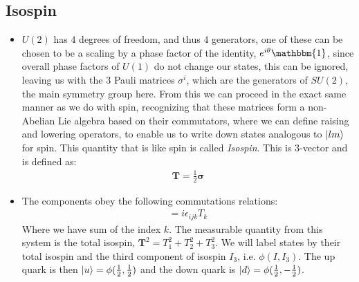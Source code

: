 \documentclass[11pt]{article}
\numberwithin{equation}{section}
\begin{document}
\subsection{Isospin} %
\label{sub:isospin}
\begin{itemize}
    \item  $U(2)$ has $4$ degrees of freedom, and thus $4$ generators, one of these can be chosen to be a scaling by a phase factor of the identity, $e^{i\theta}\mathbbm{1}$, since overall phase factors of $U(1)$ do not change our states, this can be ignored, leaving us with the $3$ Pauli matrices $\sigma^i$, which are the generators of $SU(2)$, the main symmetry group here. From this we can proceed in the exact same manner as we do with spin, recognizing that these matrices form a non-Abelian Lie algebra based on their commutators, where we can define raising and lowering operators, to enable us to write down states analogous to $\ket{lm}$ for spin. This quantity that is like spin is called \emph{Isospin}. This is 3-vector and is defined as:
    \begin{align*}
        \textbf{T} = \frac{1}{2}\boldsymbol{\sigma}
    \end{align*}
    \item The components obey the following commutations relations:
    \begin{align*}
         [T_i,T_j] = i\epsilon_{ijk}T_k
     \end{align*} 
     Where we have sum of the index $k$. The measurable quantity from this system is the total isospin, $ \textbf{T}^2 = T_1^2+T_2^2+T_3^2$. We will label states by their total isospin and the third component of isospin $I_3$, i.e. $\phi(I,I_3)$. The up quark is then $\ket{u} = \phi(\frac{1}{2},\frac{1}{2})$ and the down quark is $\ket{d} = \phi(\frac{1}{2},-\frac{1}{2})$. 
\end{itemize}
\end{document}

